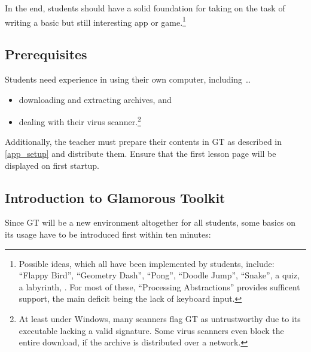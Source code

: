 In the end, students should have a solid foundation for taking on the task of writing a basic but still interesting app or game.\footnote{Possible ideas, which all have been implemented by students, include: ``Flappy Bird'', ``Geometry Dash'', ``Pong'', ``Doodle Jump'', ``Snake'', a quiz, a labyrinth, \etc. For most of these, ``Processing Abstractions'' provides sufficent support, the main deficit being the lack of keyboard input.}


\subsection{Prerequisites}

Students need experience in using their own computer, including \dots
\begin{itemize}
\item downloading and extracting archives, and
\item dealing with their virus scanner.\footnote{At least under Windows, many scanners flag \ac{GT} as untrustworthy due to its executable lacking a valid signature. Some virus scanners even block the entire download, if the archive is distributed over a network.}
\end{itemize}

Additionally, the teacher must prepare their contents in \ac{GT} \eg as described in \ref{app_setup} and distribute them. Ensure that the first lesson page will be displayed on first startup.


\subsection{Introduction to Glamorous Toolkit} \label{ssc_lesson_gt}

Since \ac{GT} will be a new environment altogether for all students, some basics on its usage have to be introduced first within ten minutes:

